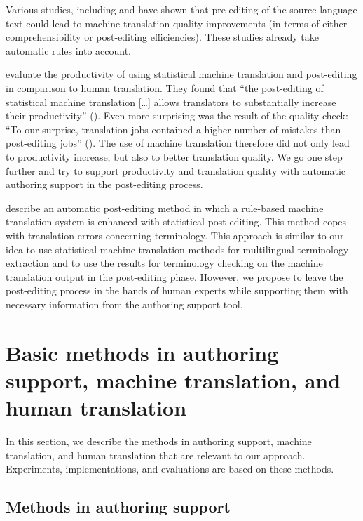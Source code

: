 \documentclass[output=paper]{LSP/langsci}
\begin{document}
Various studies, including \citet{OBrien2007} and \citet{AikawaEtAl2007} have shown that pre-editing of the source language text could lead to machine translation quality improvements (in terms of either comprehensibility or post-editing efficiencies). These studies already take automatic rules into account. 

\citet{Plitt2010} evaluate the productivity of using statistical machine translation and post-editing in comparison to human translation. They found that ``the post-editing of statistical machine translation [\ldots] allows translators to substantially increase their productivity'' (\citeyear[15]{Plitt2010}). 
Even more surprising was the result of the quality check: ``To our surprise, translation jobs contained a higher number of mistakes than post-editing jobs'' (\citeyear[14]{Plitt2010}).  
The use of machine translation therefore did not only lead to productivity increase, but also to better translation quality. We go one step further and try to support productivity and translation quality with automatic authoring support in the post-editing process.

\citet{SimardEtAl2007} describe an automatic post-editing method in which a rule-based machine translation system is enhanced with statistical post-editing. This method copes with translation errors concerning terminology. This approach is similar to our idea to use statistical machine translation methods for multilingual terminology extraction and to use the results for terminology checking on the machine translation output in the post-editing phase. However, we propose to leave the post-editing process in the hands of human experts while supporting them with necessary information from the authoring support tool.

\section{Basic methods in authoring support, machine translation, and human translation}\label{sec:siegel:3}

In this section, we describe the methods in authoring support, machine translation, and human translation that are relevant to our approach. Experiments, implementations, and evaluations are based on these methods.

\subsection{Methods in authoring support}\label{sec:siegel:3.1}
\end{document}
